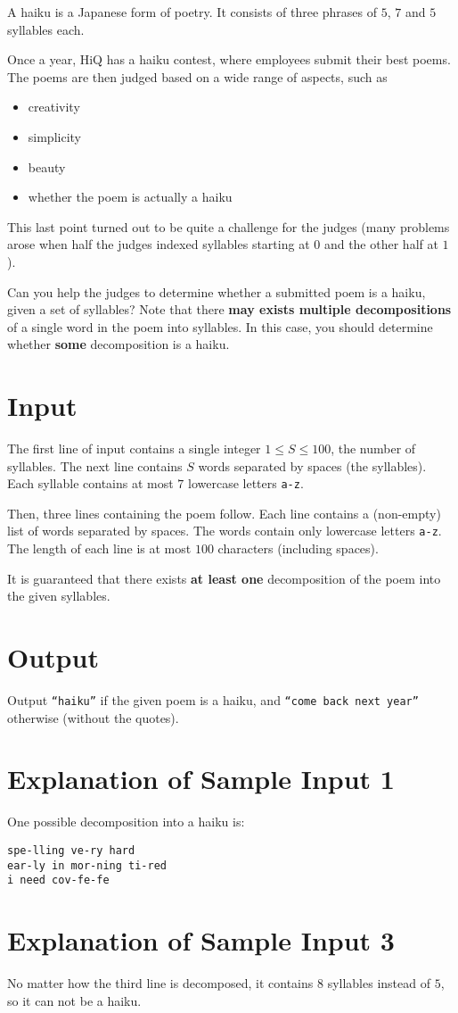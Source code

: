 A haiku is a Japanese form of poetry.
It consists of three phrases of $5$, $7$ and $5$ syllables each.

Once a year, HiQ has a haiku contest, where employees submit their best poems.
The poems are then judged based on a wide range of aspects, such as
\begin{itemize}
    \item creativity
    \item simplicity
    \item beauty
    \item whether the poem is actually a haiku
\end{itemize}
This last point turned out to be quite a challenge for the judges (many problems arose when half the judges indexed syllables starting at $0$ and the other half at $1$).

Can you help the judges to determine whether a submitted poem is a haiku, given a set of syllables?
Note that there \textbf{may exists multiple decompositions} of a single word in the poem into syllables.
In this case, you should determine whether \textbf{some} decomposition is a haiku.

\section*{Input}
The first line of input contains a single integer $1 \le S \le 100$, the number of syllables.
The next line contains $S$ words separated by spaces (the syllables).
Each syllable contains at most $7$ lowercase letters \texttt{a-z}.

Then, three lines containing the poem follow.
Each line contains a (non-empty) list of words separated by spaces.
The words contain only lowercase letters \texttt{a-z}.
The length of each line is at most $100$ characters (including spaces).

It is guaranteed that there exists \textbf{at least one} decomposition of the poem into the given syllables.

\section*{Output}
Output \texttt{``haiku''} if the given poem is a haiku, and \texttt{``come back next year''} otherwise (without the quotes).

\section*{Explanation of Sample Input 1}
One possible decomposition into a haiku is:
\begin{verbatim}
spe-lling ve-ry hard
ear-ly in mor-ning ti-red
i need cov-fe-fe
\end{verbatim}

\section*{Explanation of Sample Input 3}
No matter how the third line is decomposed, it contains $8$ syllables instead of $5$, so it can not be a haiku.

